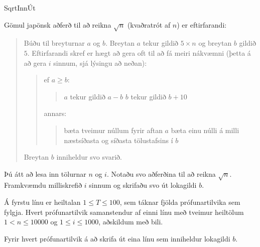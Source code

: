\begin{problem}{Sqrt}{Inn}{Út}{~}{~}

	Gömul japönsk aðferð til að reikna $\sqrt{n}$ (kvaðratrót af $n$) er eftirfarandi:

	\begin{quote}
		Búðu til breyturnar $a$ og $b$.\newline
		Breytan $a$ tekur gildið $5 \times n$ og breytan $b$ gildið $5$.\newline
		\newline
		Eftirfarandi skref er hægt að gera oft til að fá meiri nákvæmni (þetta á að gera $i$ sinnum, sjá lýsingu að neðan):

		\begin{quote}
			ef $a \geq b$:
			\begin{quote}
				$a$ tekur gildið $a - b$\newline
				$b$ tekur gildið $b + 10$
			\end{quote}
			annars:
			\begin{quote}
				bæta tveimur núllum fyrir aftan $a$\newline
				bæta einu núlli á milli næstsíðasta og síðasta tölustafsins í $b$
			\end{quote}
		\end{quote}

		Breytan $b$ inniheldur svo svarið.

	\end{quote}

	Þú átt að lesa inn tölurnar $n$ og $i$. Notaðu svo aðferðina til að reikna $\sqrt{n}$. Framkvæmdu milliskrefið $i$ sinnum og skrifaðu svo út lokagildi $b$.

	\Input

		Á fyrstu línu er heiltalan $1 \leq T \leq 100$, sem táknar fjölda prófunartilvika sem fylgja. Hvert prófunartilvik samanstendur af einni línu með tveimur heiltölum $1 < n \leq 10000$ og $1 \leq i \leq 1000$, aðskildum með bili.

	\Output

		Fyrir hvert prófunartilvik á að skrifa út eina línu sem inniheldur lokagildi $b$.

	\Examples

	\begin{example}
%
	\end{example}

\end{problem}